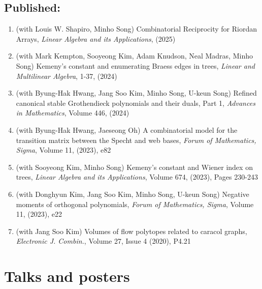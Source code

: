 \documentclass[letterpaper]{article}
\begin{document}
\subsection*{Published:}
\begin{enumerate}
\item (with Louis W. Shapiro, Minho Song) Combinatorial Reciprocity for Riordan Arrays, {\it Linear Algebra and its Applications}, (2025)
\item (with Mark Kempton, Sooyeong Kim, Adam Knudson, Neal Madras, Minho Song) Kemeny’s constant and enumerating Braess edges in trees, {\it Linear and Multilinear Algebra}, 1-37, (2024)
\item (with Byung-Hak Hwang, Jang Soo Kim, Minho Song, U-keun Song) Refined canonical stable Grothendieck polynomials and their duals, Part 1,
  {\it Advances in Mathematics}, Volume 446, (2024)
\item (with Byung-Hak Hwang, Jaeseong Oh) A combinatorial model for the transition matrix between the Specht and web bases,
  {\it Forum of Mathematics, Sigma}, Volume 11, (2023), e82
\item (with Sooyeong Kim, Minho Song) Kemeny’s constant and Wiener index on trees,
  {\it Linear Algebra and its Applications}, Volume 674, (2023), Pages 230-243
\item (with Donghyun Kim, Jang Soo Kim, Minho Song, U-keun Song) Negative moments of orthogonal polynomials,
  {\it Forum of Mathematics, Sigma}, Volume 11, (2023), e22
\item (with Jang Soo Kim) Volumes of flow polytopes related to caracol graphs,
  {\it Electronic J. Combin.}, Volume 27, Issue 4 (2020), P4.21
\end{enumerate}


\section*{Talks and posters}
\end{document}
